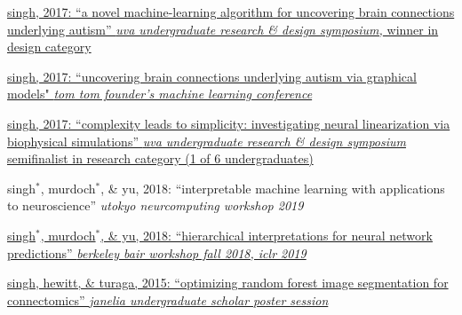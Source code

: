 \begin{minipage}[t]{0.675\textwidth}
\begin{tightitemize}
\item \href{https://docs.google.com/presentation/d/1GO6lN5o2idozOUdnObXGnXKFbZiJiKKKkmx73uE4BAI/pub?start=false&loop=false&delayms=600000&slide=id.p4}{singh, 2017: ``a novel machine-learning algorithm for uncovering brain connections underlying autism'' \textit{uva undergraduate research \& design symposium,} winner in design category \faChain}
\item \href{https://docs.google.com/presentation/d/1KghayB2g8u5xwVuILzT4XtalKi3rerVROaoRb6RUVBk/edit}{singh, 2017: ``uncovering brain connections underlying autism via graphical models" \textit{tom tom founder's machine learning conference} \faChain} 
\item \href{https://docs.google.com/presentation/d/1JriXXofysuXyfU4CeyNHJUTYSfa18R9Q3EhkCwFwh4g/pub?start=false&loop=false&delayms=600000&slide=id.p}{singh, 2017: ``complexity leads to simplicity: investigating neural linearization via biophysical simulations'' \textit{uva undergraduate research \& design symposium} semifinalist in research category (1 of 6 undergraduates) \faChain}
\end{tightitemize}

\begin{tightitemize}
\item singh$^*$, murdoch$^*$, \& yu, 2018: ``interpretable machine learning with applications to neuroscience'' \textit{utokyo neurcomputing workshop 2019}
\item \href{https://arxiv.org/abs/1806.05337}{singh$^*$, murdoch$^*$, \& yu, 2018: ``hierarchical interpretations for neural network predictions'' \textit{berkeley bair workshop fall 2018, iclr 2019} \faChain} 
\item \href{https://csinva.github.io/assets/rf_segmentation_2015.pdf}{singh, hewitt, \& turaga, 2015: ``optimizing random forest image segmentation for connectomics” \textit{janelia undergraduate scholar poster session} \faChain}
\end{tightitemize}

\sectionspace %


\end{minipage}
